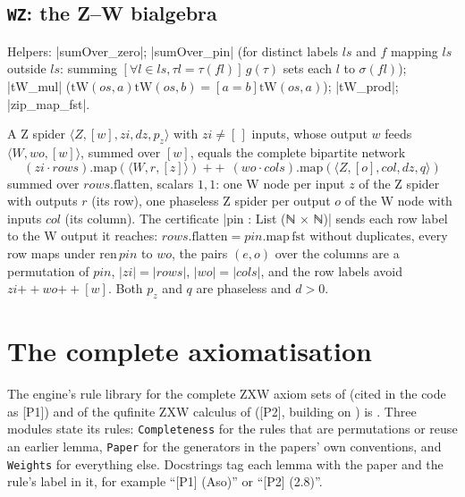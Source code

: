 \subsection{\texttt{WZ}: the Z--W bialgebra}

Helpers: \lean|sumOver_zero|; \lean|sumOver_pin| (for distinct labels $ls$ and $f$ mapping $ls$
outside $ls$: summing $[\forall l\in ls,\tau l=\tau(f l)]\,g(\tau)$ sets each $l$ to
$\sigma(f l)$); \lean|tW_mul| ($\mathrm{tW}(os,a)\mathrm{tW}(os,b)=[a=b]\mathrm{tW}(os,a)$);
\lean|tW_prod|; \lean|zip_map_fst|.

\begin{lemma}
A Z spider $\langle Z,[w],zi,dz,p_z\rangle$ with $zi\ne[\,]$ inputs, whose output $w$ feeds
$\langle W,wo,[w]\rangle$, summed over $[w]$, equals the complete bipartite network
\[
 (zi\cdot rows).\mathrm{map}(\langle W,r,[z]\rangle)\ \mathbin{+\!\!+}\ (wo\cdot cols).\mathrm{map}(\langle Z,[o],col,dz,q\rangle)
\]
summed over $rows.\mathrm{flatten}$, scalars $1,1$: one W node per input $z$ of the Z spider with
outputs $r$ (its row), one phaseless Z spider per output $o$ of the W node with inputs $col$ (its
column). The certificate \lean|pin : List (ℕ × ℕ)| sends each row label to the W output it reaches:
$rows.\mathrm{flatten}=pin.\mathrm{map\,fst}$ without duplicates, every row maps under
$\mathrm{ren}\,pin$ to $wo$, the pairs $(e,o)$ over the columns are a permutation of $pin$,
$|zi|=|rows|$, $|wo|=|cols|$, and the row labels avoid $zi\mathbin{+\!\!+}wo\mathbin{+\!\!+}[w]$. Both
$p_z$ and $q$ are phaseless and $d>0$.
\end{lemma}

\section{The complete axiomatisation}\label{sec:lean-core-complete}

The engine's rule library for the complete ZXW axiom sets of \citet{poor2023zxw} (cited in the code
as [P1]) and of the qufinite ZXW calculus of \citet{wang2023qufinitezxw} ([P2], building on
\citet{wang2021qufinite}) is . Three modules state its rules:
\texttt{Completeness} for the rules that are permutations or reuse an earlier lemma, \texttt{Paper}
for the generators in the papers' own conventions, and \texttt{Weights} for everything else.
Docstrings tag each lemma with the paper and the rule's label in it, for example ``[P1] (Aso)'' or
``[P2] (2.8)''.

